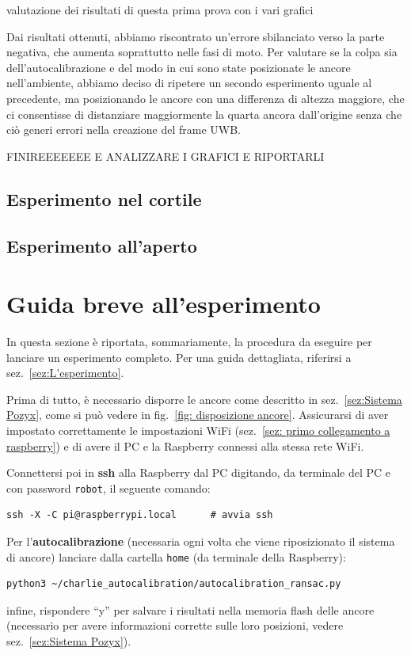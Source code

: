 valutazione dei risultati di questa prima prova con i vari grafici

Dai risultati ottenuti, abbiamo riscontrato un'errore sbilanciato verso la parte negativa, che aumenta soprattutto nelle fasi di moto. Per valutare se la colpa sia dell'autocalibrazione e del modo in cui sono state posizionate le ancore nell'ambiente, abbiamo deciso di ripetere un secondo esperimento uguale al precedente, ma posizionando le ancore con una differenza di altezza maggiore, che ci consentisse di distanziare maggiormente la quarta ancora dall'origine senza che ciò generi errori nella creazione del frame UWB.

FINIREEEEEEE E ANALIZZARE I GRAFICI E RIPORTARLI 
\subsection{Esperimento nel cortile}

\subsection{Esperimento all'aperto}



\newpage
\section{Guida breve all'esperimento}
\label{sez: Guida breve all'esperimento}
In questa sezione è riportata, sommariamente, la procedura da eseguire per lanciare un esperimento completo. Per una guida dettagliata, riferirsi a sez.~\ref{sez:L'esperimento}. 

Prima di tutto, è necessario disporre le ancore come descritto in sez.~\ref{sez:Sistema Pozyx}, come si può vedere in fig.~\ref{fig: disposizione ancore}. Assicurarsi di aver impostato correttamente le impostazioni WiFi (sez.~\ref{sez: primo collegamento a raspberry}) e di avere il PC e la Raspberry connessi alla stessa rete WiFi.


Connettersi poi in \textbf{ssh} alla Raspberry dal PC digitando, da terminale del PC e con password \texttt{robot}, il seguente comando:
\begin{lstlisting}[style=bashPC]
	ssh -X -C pi@raspberrypi.local		# avvia ssh
\end{lstlisting}

Per l'\textbf{autocalibrazione} (necessaria ogni volta che viene riposizionato il sistema di ancore) lanciare 
dalla cartella \texttt{home} (da terminale della Raspberry):
\begin{lstlisting}[style=bash]
	python3 ~/charlie_autocalibration/autocalibration_ransac.py
\end{lstlisting}
infine, rispondere ``y'' per salvare i risultati nella memoria flash delle ancore (necessario per avere informazioni corrette sulle loro posizioni, vedere sez.~\ref{sez:Sistema Pozyx}).

